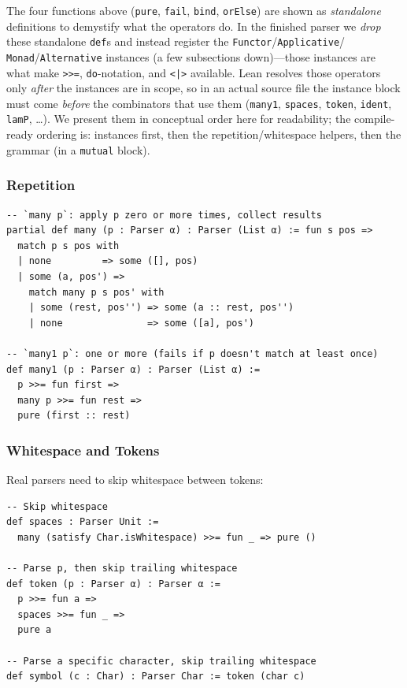 \documentclass[11pt,a4paper]{article}
\theoremstyle{definition}
\begin{document}
\begin{warning}
The four functions above (\texttt{pure}, \texttt{fail}, \texttt{bind},
\texttt{orElse}) are shown as \emph{standalone} definitions to demystify what
the operators do. In the finished parser we \emph{drop} these standalone
\texttt{def}s and instead register the \texttt{Functor}/\texttt{Applicative}/%
\texttt{Monad}/\texttt{Alternative} instances (a few subsections down)---those
instances are what make \texttt{>>=}, \texttt{do}-notation, and \texttt{<|>}
available. Lean resolves those operators only \emph{after} the instances are in
scope, so in an actual source file the instance block must come \emph{before}
the combinators that use them (\texttt{many1}, \texttt{spaces}, \texttt{token},
\texttt{ident}, \texttt{lamP}, \ldots). We present them in conceptual order
here for readability; the compile-ready ordering is: instances first, then the
repetition/whitespace helpers, then the grammar (in a \texttt{mutual} block).
\end{warning}

\subsubsection{Repetition}

\begin{verbatim}
-- `many p`: apply p zero or more times, collect results
partial def many (p : Parser α) : Parser (List α) := fun s pos =>
  match p s pos with
  | none         => some ([], pos)
  | some (a, pos') =>
    match many p s pos' with
    | some (rest, pos'') => some (a :: rest, pos'')
    | none               => some ([a], pos')

-- `many1 p`: one or more (fails if p doesn't match at least once)
def many1 (p : Parser α) : Parser (List α) :=
  p >>= fun first =>
  many p >>= fun rest =>
  pure (first :: rest)
\end{verbatim}

\subsubsection{Whitespace and Tokens}

Real parsers need to skip whitespace between tokens:

\begin{verbatim}
-- Skip whitespace
def spaces : Parser Unit :=
  many (satisfy Char.isWhitespace) >>= fun _ => pure ()

-- Parse p, then skip trailing whitespace
def token (p : Parser α) : Parser α :=
  p >>= fun a =>
  spaces >>= fun _ =>
  pure a

-- Parse a specific character, skip trailing whitespace
def symbol (c : Char) : Parser Char := token (char c)
\end{verbatim}
\end{document}
